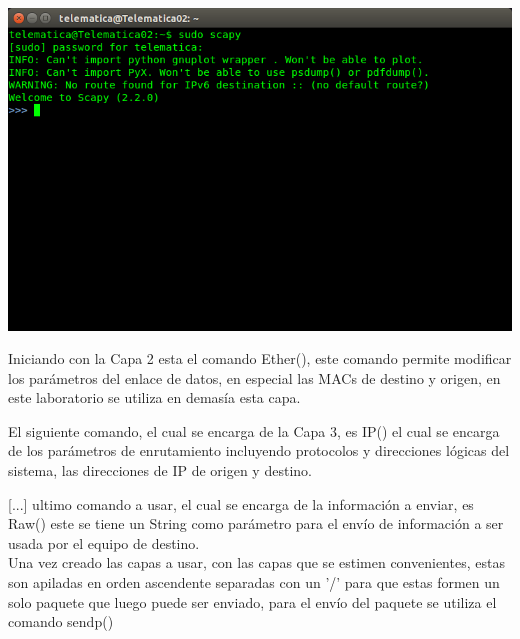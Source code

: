 ﻿\documentclass[spanish]{udpreport}
\begin{document}
\begin{center}
	\includegraphics[scale=.37]{imagenes/Scapy_Init.png}
\end{center}

Iniciando con la Capa 2 esta el comando Ether(), este comando permite modificar los parámetros del enlace de datos, en especial las MACs de destino y origen, en este laboratorio se utiliza en demasía esta capa.


El siguiente comando, el cual se encarga de la Capa 3, es IP() el cual se encarga de los parámetros de enrutamiento incluyendo protocolos y direcciones lógicas del sistema, las direcciones de IP de origen y destino.



[...] ultimo comando a usar, el cual se encarga de la información a enviar, es Raw() este se tiene un String como parámetro para el envío de información a ser usada por el equipo de destino.
\\

Una vez creado las capas a usar, con las capas que se estimen convenientes, estas son apiladas en orden ascendente separadas con un '/' para que estas formen un solo paquete que luego puede ser enviado, para el envío del paquete se utiliza el comando sendp() %


\newpage
\end{document}
